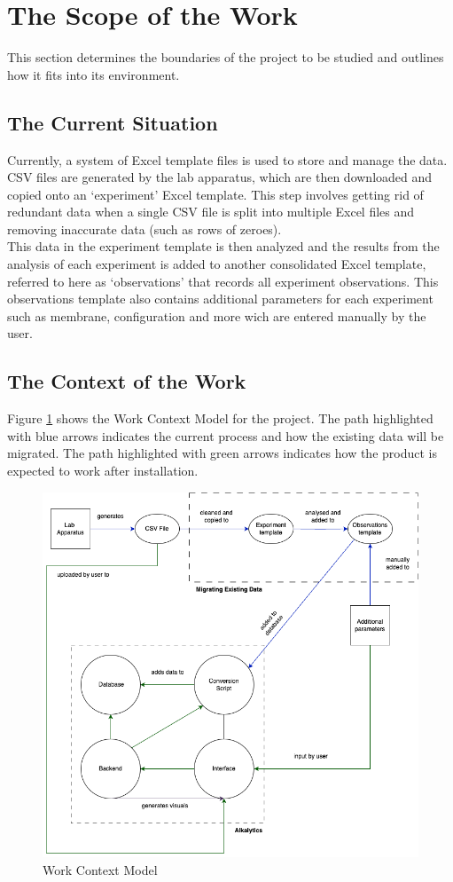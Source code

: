 \documentclass[12pt]{article}
\begin{document}
\section{The Scope of the Work}
This section determines the boundaries of the project to be studied and outlines how it fits into its environment.
\subsection{The Current Situation}
Currently, a system of Excel template files is used to store and manage the data. CSV files are generated by the lab apparatus,
which are then downloaded and copied onto an `experiment' Excel template. This step involves getting rid of redundant data when a single CSV file is
split into multiple Excel files and removing inaccurate data (such as rows of zeroes).\\
\newline
This data in the experiment template is then analyzed and the results from the analysis of each experiment is added to another consolidated Excel template,
referred to here as `observations' that records all experiment observations. This observations template also contains additional parameters for each experiment 
such as membrane, configuration and more wich are entered manually by the user.
\subsection{The Context of the Work}
Figure \ref{WorkContextModel} shows the Work Context Model for the project. The
path highlighted with blue arrows indicates the current process and how the
existing data will be migrated. The path highlighted with green arrows indicates
how the product is expected to work after installation.
\begin{figure}[H]
  \centering
  \includegraphics[scale=0.55]{Diagrams/Work Context Diagram.drawio.png}
  \caption{Work Context Model}
  \label{WorkContextModel}
\end{figure}
\end{document}
